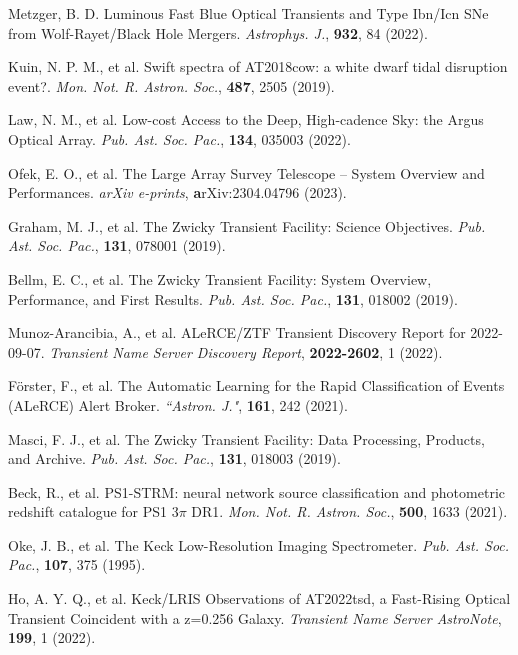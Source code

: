 \documentclass{nature_plusfigure}
\newcommand{\mn}{{Mon. Not. R. Astron. Soc.}}
\newcommand{\mnras}{\mn}
\newcommand{\aj}{{``Astron. J."}}
\newcommand{\apj}{{Astrophys. J.}}
\newcommand{\pasp}{{Pub. Ast. Soc. Pac.}}
\begin{document}
\begin{thebibliography}{100}

  Metzger, B. D. Luminous Fast Blue Optical Transients and Type Ibn/Icn SNe from Wolf-Rayet/Black Hole Mergers. \emph{\apj}, \textbf{932}, 84 (2022). 

  Kuin, N. P. M., et al. Swift spectra of AT2018cow: a white dwarf tidal disruption event?. \emph{\mnras}, \textbf{487}, 2505 (2019). 


 Law, N. M., et al. Low-cost Access to the Deep, High-cadence Sky: the Argus Optical Array. \emph{\pasp}, \textbf{134}, 035003 (2022). 

  Ofek, E. O., et al. The Large Array Survey Telescope -- System Overview and Performances. \emph{arXiv e-prints}, \textbf arXiv:2304.04796 (2023). 

 Graham, M. J., et al. The Zwicky Transient Facility: Science Objectives. \emph{\pasp}, \textbf{131}, 078001 (2019). 

 Bellm, E. C., et al. The Zwicky Transient Facility: System Overview, Performance, and First Results. \emph{\pasp}, \textbf{131}, 018002 (2019). 


 Munoz-Arancibia, A., et al. ALeRCE/ZTF Transient Discovery Report for 2022-09-07. \emph{Transient Name Server Discovery Report}, \textbf{2022-2602}, 1 (2022). 

 Förster, F., et al. The Automatic Learning for the Rapid Classification of Events (ALeRCE) Alert Broker. \emph{\aj}, \textbf{161}, 242 (2021). 

 Masci, F. J., et al. The Zwicky Transient Facility: Data Processing, Products, and Archive. \emph{\pasp}, \textbf{131}, 018003 (2019). 

 Beck, R., et al. PS1-STRM: neural network source classification and photometric redshift catalogue for PS1 3$\pi$ DR1. \emph{\mnras}, \textbf{500}, 1633 (2021). 

 Oke, J. B., et al. The Keck Low-Resolution Imaging Spectrometer. \emph{\pasp}, \textbf{107}, 375 (1995). 

 Ho, A. Y. Q., et al. Keck/LRIS Observations of AT2022tsd, a Fast-Rising Optical Transient Coincident with a z=0.256 Galaxy. \emph{Transient Name Server AstroNote}, \textbf{199}, 1 (2022). 


\end{thebibliography}
\end{document}
